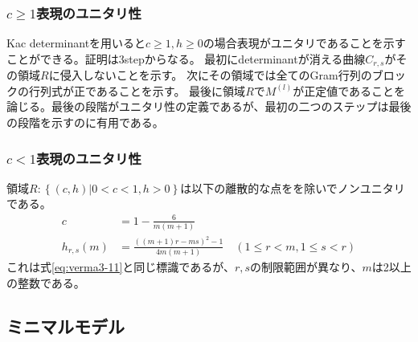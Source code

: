 \documentclass[11pt, aps, longbibliography]{article}
\numberwithin{equation}{section}
\begin{document}
        \subsubsection{$c\geq 1$表現のユニタリ性}
        Kac determinantを用いると$c\geq 1, h\geq 0$の場合表現がユニタリであることを示すことができる。証明は3stepからなる。
        最初にdeterminantが消える曲線$C_{r,s}$がその領域$R$に侵入しないことを示す。
        次にその領域では全てのGram行列のブロックの行列式が正であることを示す。
        最後に領域$R$で$M^{(l)}$が正定値であることを論じる。最後の段階がユニタリ性の定義であるが、最初の二つのステップは最後の段階を示すのに有用である。

        \subsubsection{$c<1$表現のユニタリ性}
        領域$R:\left\{(c,h)| 0 < c < 1, h>0\right\}$は以下の離散的な点をを除いでノンユニタリである。
        \begin{align}\label{eq:verma5-1}
            c &= 1-\frac{6}{m(m+1)} \\
            h_{r,s}(m) &= \frac{\left( (m+1)r - ms \right)^2 -1}{4m(m+1)} \quad (1\leq r < m, 1\leq s < r)
        \end{align}
        これは式\eqref{eq:verma3-11}と同じ標識であるが、$r,s$の制限範囲が異なり、$m$は2以上の整数である。

    \subsection{ミニマルモデル}
\end{document}
